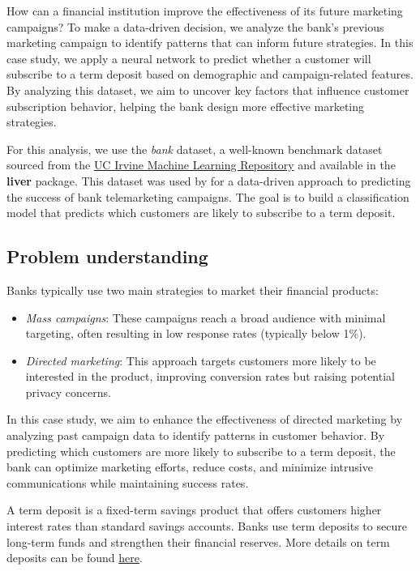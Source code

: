 \documentclass[
]{book}
\providecommand{\tightlist}{%
  \setlength{\itemsep}{0pt}\setlength{\parskip}{0pt}}
\theoremstyle{definition}
\theoremstyle{definition}
\theoremstyle{definition}
\theoremstyle{definition}
\theoremstyle{remark}
\begin{document}
How can a financial institution improve the effectiveness of its future marketing campaigns? To make a data-driven decision, we analyze the bank's previous marketing campaign to identify patterns that can inform future strategies. In this case study, we apply a neural network to predict whether a customer will subscribe to a term deposit based on demographic and campaign-related features. By analyzing this dataset, we aim to uncover key factors that influence customer subscription behavior, helping the bank design more effective marketing strategies.

For this analysis, we use the \emph{bank} dataset, a well-known benchmark dataset sourced from the \href{https://archive.ics.uci.edu/dataset/222/bank+marketing}{UC Irvine Machine Learning Repository} and available in the \textbf{liver} package. This dataset was used by \citet{moro2014data} for a data-driven approach to predicting the success of bank telemarketing campaigns. The goal is to build a classification model that predicts which customers are likely to subscribe to a term deposit.

\subsection*{Problem understanding}\label{problem-understanding-3}

Banks typically use two main strategies to market their financial products:

\begin{itemize}
\tightlist
\item
  \emph{Mass campaigns}: These campaigns reach a broad audience with minimal targeting, often resulting in low response rates (typically below 1\%).\\
\item
  \emph{Directed marketing}: This approach targets customers more likely to be interested in the product, improving conversion rates but raising potential privacy concerns.
\end{itemize}

In this case study, we aim to enhance the effectiveness of directed marketing by analyzing past campaign data to identify patterns in customer behavior. By predicting which customers are more likely to subscribe to a term deposit, the bank can optimize marketing efforts, reduce costs, and minimize intrusive communications while maintaining success rates.

A term deposit is a fixed-term savings product that offers customers higher interest rates than standard savings accounts. Banks use term deposits to secure long-term funds and strengthen their financial reserves. More details on term deposits can be found \href{https://www.investopedia.com/terms/t/termdeposit.asp}{here}.
\end{document}
